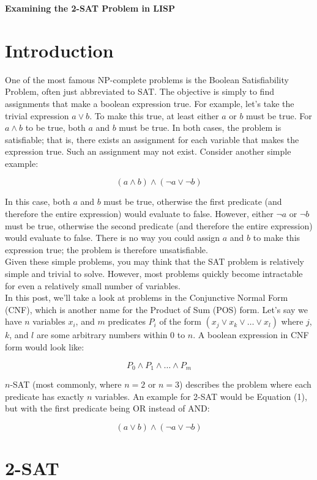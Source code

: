 \documentclass{article}
\begin{document}
\date{}

{\Large
\textbf{Examining the 2-SAT Problem in LISP}}

\section{Introduction}

One of the most famous NP-complete problems is the Boolean Satisfiability Problem, often just abbreviated to SAT. The objective is simply to find assignments that make a boolean expression true. For example, let's take the trivial expression \(a \vee b\). To make this true, at least either \(a\) or \(b\) must be true. For \(a \wedge b\) to be true, both \(a\) and \(b\) must be true. In both cases, the problem is satisfiable; that is, there exists an assignment for each variable that makes the expression true. Such an assignment may not exist. Consider another simple example:

\begin{equation}
(a \wedge b) \wedge (\neg a \vee \neg b)
\end{equation}

In this case, both \(a\) and \(b\) must be true, otherwise the first predicate (and therefore the entire expression) would evaluate to false.  However, either \(\neg a\) or \(\neg b\) must be true, otherwise the second predicate (and therefore the entire expression) would evaluate to false. There is no way you could assign \(a\) and \(b\) to make this expression true; the problem is therefore unsatisfiable.\\

Given these simple problems, you may think that the SAT problem is relatively simple and trivial to solve. However, most problems quickly become intractable for even a relatively small number of variables.\\

In this post, we'll take a look at problems in the Conjunctive Normal Form (CNF), which is another name for the Product of Sum (POS) form. Let's say we have \(n\) variables \(x_{i}\), and \(m\) predicates \(P_{i}\) of the form \((x_{j} \vee x_{k} \vee \hdots \vee x_{l})\) where \(j\), \(k\), and \(l\) are some arbitrary numbers within \(0\) to \(n\). A boolean expression in CNF form would look like:

\begin{equation}
P_{0} \wedge P_{1} \wedge \hdots \wedge P_{m}
\end{equation}

\(n\)-SAT (most commonly, where \(n = 2\) or \(n = 3\)) describes the problem where each predicate has exactly \(n\) variables. An example for 2-SAT would be Equation (1), but with the first predicate being OR instead of AND:

\begin{equation}
(a \vee b) \wedge (\neg a \vee \neg b)
\end{equation}

\section{2-SAT}
\end{document}
